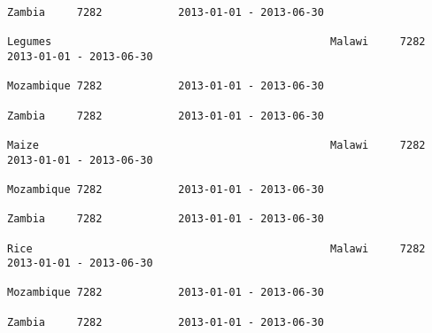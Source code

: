 \documentclass[11pt]{article}
\begin{document}
\begin{Verbatim}[commandchars=\\\{\}]
                                                                                                                                                                                                                 Zambia     7282            2013-01-01 - 2013-06-30   
                                                                                                                                                              Legumes                                            Malawi     7282            2013-01-01 - 2013-06-30   
                                                                                                                                                                                                                 Mozambique 7282            2013-01-01 - 2013-06-30   
                                                                                                                                                                                                                 Zambia     7282            2013-01-01 - 2013-06-30   
                                                                                                                                                              Maize                                              Malawi     7282            2013-01-01 - 2013-06-30   
                                                                                                                                                                                                                 Mozambique 7282            2013-01-01 - 2013-06-30   
                                                                                                                                                                                                                 Zambia     7282            2013-01-01 - 2013-06-30   
                                                                                                                                                              Rice                                               Malawi     7282            2013-01-01 - 2013-06-30   
                                                                                                                                                                                                                 Mozambique 7282            2013-01-01 - 2013-06-30   
                                                                                                                                                                                                                 Zambia     7282            2013-01-01 - 2013-06-30   

\end{Verbatim}
\end{document}
